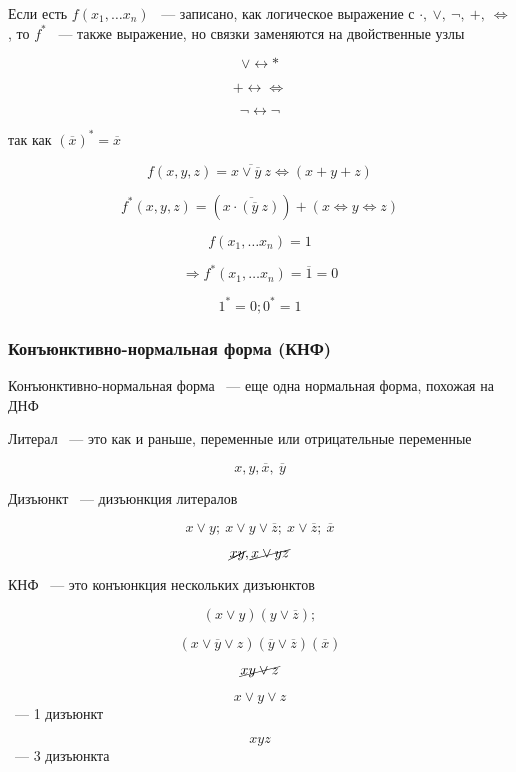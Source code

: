 \documentclass[russian]{lecture-notes}
\begin{document}
\begin{sloppypar}
\begin{corollary}
	Если есть $f(x_1, \dots x_n)$ ~--- записано, как логическое выражение с $\cdot, \: \lor, \: \neg, \: +, \: \Leftrightarrow$, то $f^*$ ~--- также выражение, но связки заменяются на двойственные узлы
	
	$$\lor \leftrightarrow *$$

	$$+ \leftrightarrow \Leftrightarrow$$
	
	$$\neg \leftrightarrow \neg$$
	
	так как $(\overline{x})^* = \overline{x}$
\end{corollary}

\begin{example}

	$$f(x, y, z) = \overline{x \lor \overline{y} \: z} \Leftrightarrow (x + y + z)$$
	
	$$f^*(x, y, z) = (\overline{x \cdot (\overline{y} \: z)}) + (x \Leftrightarrow y \Leftrightarrow z)$$
\end{example}

\begin{example}

	$$f(x_1, \dots x_n) = 1$$
	
	$$\Rightarrow f^*(x_1, \dots x_n) = \overline{1} = 0$$
	
	$$1^* = 0; 0^* = 1$$
\end{example}

\subsubsection{Конъюнктивно-нормальная форма (КНФ)}

\begin{definition}
	Конъюнктивно-нормальная форма ~--- еще одна нормальная форма, похожая на ДНФ
\end{definition}

\begin{definition}
	Литерал ~--- это как и раньше, переменные или отрицательные переменные
	
	$$x, y, \overline{x}, \: \overline{y}$$
\end{definition}

\begin{definition}
	Дизъюнкт ~--- дизъюнкция литералов
	
	$$x \lor y; \: x \lor y \lor \overline{z}; \: x \lor \overline{z}; \: \overline{x}$$
	
	$$\cancel{xy}, \cancel{x \lor yz}$$
\end{definition}

\begin{definition}
	КНФ ~--- это конъюнкция нескольких дизъюнктов
	
	$$(x \lor y)(y \lor \overline{z});$$
	
	$$(x \lor \overline{y} \lor z)(\overline{y} \lor \overline{z})(\overline{x})$$
	
	$$\cancel{xy \lor z}$$
	
	$$x \lor y \lor z$$ ~--- 1 дизъюнкт
	
	$$xyz$$ ~--- 3 дизъюнкта
\end{definition}

\end{sloppypar}
\end{document}
